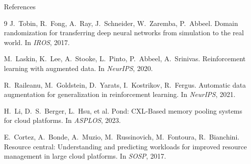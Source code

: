 \documentclass[11pt,aspectratio=43]{beamer}
\begin{document}
\begin{frame}[allowframebreaks]{References}
  \begin{thebibliography}{9}
    J.~Tobin, R.~Fong, A.~Ray, J.~Schneider, W.~Zaremba, P.~Abbeel.
    \newblock Domain randomization for transferring deep neural networks from
    simulation to the real world.
    \newblock In \textit{IROS}, 2017.

    M.~Laskin, K.~Lee, A.~Stooke, L.~Pinto, P.~Abbeel, A.~Srinivas.
    \newblock Reinforcement learning with augmented data.
    \newblock In \textit{NeurIPS}, 2020.

    R.~Raileanu, M.~Goldstein, D.~Yarats, I.~Kostrikov, R.~Fergus.
    \newblock Automatic data augmentation for generalization in reinforcement
    learning.
    \newblock In \textit{NeurIPS}, 2021.

    H.~Li, D.~S.~Berger, L.~Hsu, et al.
    \newblock Pond: {CXL}-Based memory pooling systems for cloud platforms.
    \newblock In \textit{ASPLOS}, 2023.

    E.~Cortez, A.~Bonde, A.~Muzio, M.~Russinovich, M.~Fontoura, R.~Bianchini.
    \newblock Resource central: Understanding and predicting workloads for
    improved resource management in large cloud platforms.
    \newblock In \textit{SOSP}, 2017.
  \end{thebibliography}
\end{frame}
\end{document}

